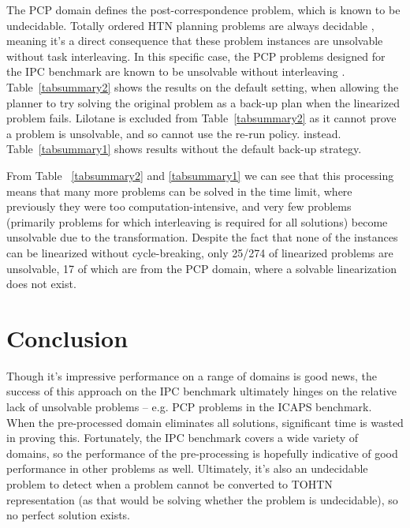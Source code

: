 \documentclass[runningheads]{llncs}
\begin{document}
The PCP domain defines the post-correspondence problem, which is known to be undecidable. Totally ordered HTN planning problems are always decidable \cite{LanguageClassificationPlanning}, meaning it's a direct consequence that these problem instances are unsolvable without task interleaving. In this specific case, the PCP problems designed for the IPC benchmark are known to be unsolvable without interleaving \cite{PCPDomain}. Table~\ref{tabsummary2} shows the results on the default setting, when allowing the planner to try solving the original problem as a back-up plan when the linearized problem fails. Lilotane is excluded from Table~\ref{tabsummary2} as it cannot prove a problem is unsolvable, and so cannot use the re-run policy. instead. Table~\ref{tabsummary1} shows results without the default back-up strategy.  %


From Table ~\ref{tabsummary2} and \ref{tabsummary1} we can see that this processing means that many more problems can be solved in the time limit, where previously they were too computation-intensive, and very few problems (primarily problems for which interleaving is required for all solutions) become unsolvable due to the transformation. Despite the fact that none of the instances can be linearized without cycle-breaking, only 25/274 of linearized problems are unsolvable, 17 of which are from the PCP domain, where a solvable linearization does not exist.


\section{Conclusion}
Though it's impressive performance on a range of domains is good news, the success of this approach on the IPC benchmark ultimately hinges on the relative lack of unsolvable problems --
e.g. PCP problems in the ICAPS benchmark. When the pre-processed domain eliminates all solutions, significant time is wasted in proving this. Fortunately, the IPC benchmark covers a wide variety of domains, so the performance of the pre-processing is hopefully indicative of good performance in other problems as well. Ultimately, it's also an undecidable problem to detect when a problem cannot be converted to TOHTN representation (as that would be solving whether the problem is undecidable), so no perfect solution exists.
\end{document}
